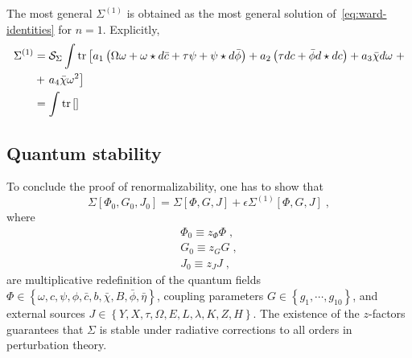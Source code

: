 \documentclass[../main.tex]{subfiles}
\begin{document}
The most general $ \Sigma^{ (1) } $ is obtained as the most general solution of~\eqref{eq:ward-identities} for $n=1$. Explicitly,
\begin{subequations}%
  \label{eq:ct-action}
  \begin{align}
    \Sigma^{ (1) } & = \mathcal{S}_{\Sigma} \int \operatorname{tr} \left[ a_1 \left( \Omega \omega + \omega \star d \bar{ c } + \tau \psi + \psi \star d \bar{ \phi } \right) + a_2 \left( \tau dc + \bar{ \phi } d \star d c \right) + a_3 \bar{ \chi } d \omega \right. + \nonumber \\
                   & + \left. a_4 \bar{ \chi } \omega^2 \right]                                                                                                                                                                                                         \\
                   & = \int \operatorname{tr} \left[  \right]
  \end{align}
\end{subequations}

\subsection{Quantum stability}\label{sec:stability;sec:quantum}

To conclude the proof of renormalizability, one has to show that
\begin{equation}
  \label{eq:multiplicative-renorm}
  \Sigma \left[ \Phi_0, G_0, J_0 \right] = \Sigma \left[ \Phi, G, J \right] + \epsilon\Sigma^{ (1) } \left[ \Phi, G, J \right] \;,
\end{equation}
where
\begin{subequations}%
  \label{eq:field-redef}
  \begin{align}
    \Phi_0 \equiv z_{ \Phi } \Phi \;, \\
    G_0 \equiv z_{ G } G \;,          \\
    J_0 \equiv z_{ J } J \;,
  \end{align}
\end{subequations}
are multiplicative redefinition of the quantum fields $ \Phi \in \left\{ \omega, c, \psi, \phi, \bar{ c }, b, \bar{ \chi }, B, \bar{ \phi }, \bar{ \eta } \right\} $, coupling parameters $ G \in \left\{ g_1, \cdots, g_{10} \right\} $, and external sources $ J \in \left\{ Y, X, \tau, \Omega, E, L, \lambda, K, Z, H \right\} $. The existence of the $ z $-factors guarantees that $ \Sigma $ is stable under radiative corrections to all orders in perturbation theory.
\end{document}
